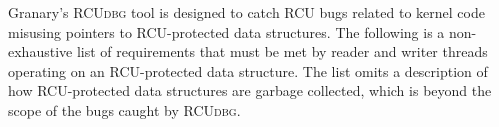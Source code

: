 \documentclass[preprint]{sigplanconf}
\newcommand{\toolname}[1]{{\scshape #1}}
\begin{document}

Granary's \toolname{RCUdbg} tool is designed to catch RCU bugs related to kernel code misusing pointers to RCU-protected data structures. The following is a non-exhaustive list of requirements that must be met by reader and writer threads operating on an RCU-protected data structure. The list omits a description of how RCU-protected data structures are garbage collected, which is beyond the scope of the bugs caught by \toolname{RCUdbg}.







\end{document}
